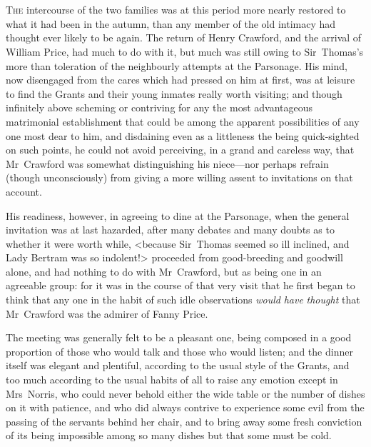 \chapter[Chapter \thechapter]{} 

 \lettrine[lraise=0.3]{T}{he} intercourse of the two families was at this period more nearly restored to what it had been in the autumn, than any member of the old intimacy had thought ever likely to be again. The return of Henry Crawford, and the arrival of William Price, had much to do with it, but much was still owing to Sir~Thomas's more than toleration of the neighbourly attempts at the Parsonage. His mind, now disengaged from the cares which had pressed on him at first, was at leisure to find the Grants and their young inmates really worth visiting; and though infinitely above scheming or contriving for any the most advantageous matrimonial establishment that could be among the apparent possibilities of any one most dear to him, and disdaining even as a littleness the being quick-sighted on such points, he could not avoid perceiving, in a grand and careless way, that Mr~Crawford was somewhat distinguishing his niece—nor perhaps refrain (though unconsciously) from giving a more willing assent to invitations on that account.

His readiness, however, in agreeing to dine at the Parsonage, when the general invitation was at last hazarded, after many debates and many doubts as to whether it were worth while, <because Sir~Thomas seemed so ill inclined, and Lady Bertram was so indolent!> proceeded from good-breeding and goodwill alone, and had nothing to do with Mr~Crawford, but as being one in an agreeable group: for it was in the course of that very visit that he first began to think that any one in the habit of such idle observations \textit{would}  \textit{have}  \textit{thought}  that Mr~Crawford was the admirer of Fanny Price.

The meeting was generally felt to be a pleasant one, being composed in a good proportion of those who would talk and those who would listen; and the dinner itself was elegant and plentiful, according to the usual style of the Grants, and too much according to the usual habits of all to raise any emotion except in Mrs~Norris, who could never behold either the wide table or the number of dishes on it with patience, and who did always contrive to experience some evil from the passing of the servants behind her chair, and to bring away some fresh conviction of its being impossible among so many dishes but that some must be cold.

